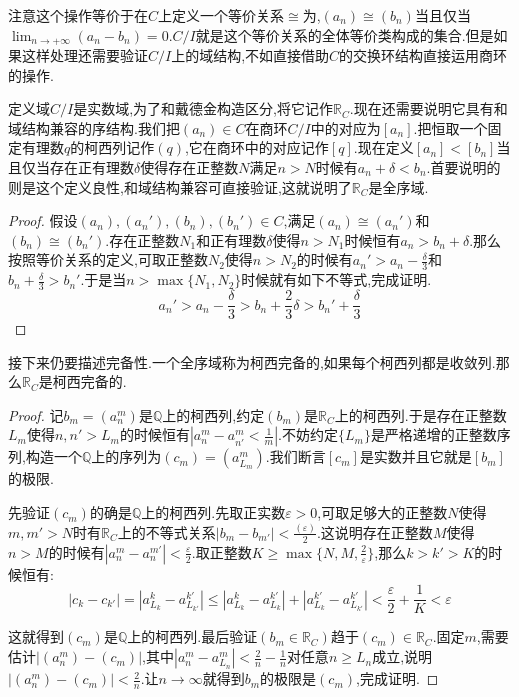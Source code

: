 注意这个操作等价于在$C$上定义一个等价关系$\cong$为,$(a_n)\cong(b_n)$当且仅当$\lim_{n\to+\infty}(a_n-b_n)=0$.$C/I$就是这个等价关系的全体等价类构成的集合.但是如果这样处理还需要验证$C/I$上的域结构,不如直接借助$C$的交换环结构直接运用商环的操作.

定义域$C/I$是实数域,为了和戴德金构造区分,将它记作$\mathbb{R}_C$.现在还需要说明它具有和域结构兼容的序结构.我们把$(a_n)\in C$在商环$C/I$中的对应为$[a_n]$.把恒取一个固定有理数$q$的柯西列记作$(q)$,它在商环中的对应记作$[q]$.现在定义$[a_n]<[b_n]$当且仅当存在正有理数$\delta$使得存在正整数$N$满足$n>N$时候有$a_n+\delta<b_n$.首要说明的则是这个定义良性,和域结构兼容可直接验证,这就说明了$\mathbb{R}_C$是全序域.
\begin{proof}
	
	假设$(a_n),(a_n'),(b_n),(b_n')\in C$,满足$(a_n)\cong(a_n')$和$(b_n)\cong(b_n')$.存在正整数$N_1$和正有理数$\delta$使得$n>N_1$时候恒有$a_n>b_n+\delta$.那么按照等价关系的定义,可取正整数$N_2$使得$n>N_2$的时候有$a_n'>a_n-\frac{\delta}{3}$和$b_n+\frac{\delta}{3}>b_n'$.于是当$n>\max\{N_1,N_2\}$时候就有如下不等式,完成证明.
	$$a_n'>a_n-\frac{\delta}{3}>b_n+\frac{2}{3}\delta>b_n'+\frac{\delta}{3}$$
\end{proof}

接下来仍要描述完备性.一个全序域称为柯西完备的,如果每个柯西列都是收敛列.那么$\mathbb{R}_C$是柯西完备的.
\begin{proof}
	
	记$b_m=(a^m_n)$是$\mathbb{Q}$上的柯西列,约定$(b_m)$是$\mathbb{R}_C$上的柯西列.于是存在正整数$L_m$使得$n,n'>L_m$的时候恒有$|a^m_n-a^m_{n'}<\frac{1}{m}|$.不妨约定$\{L_m\}$是严格递增的正整数序列,构造一个$\mathbb{Q}$上的序列为$(c_m)=(a^m_{L_m})$.我们断言$[c_m]$是实数并且它就是$[b_m]$的极限.
	
	先验证$(c_m)$的确是$\mathbb{Q}$上的柯西列.先取正实数$\varepsilon>0$,可取足够大的正整数$N$使得$m,m'>N$时有$\mathbb{R}_C$上的不等式关系$|b_m-b_{m'}|<\frac{(\varepsilon)}{2}$.这说明存在正整数$M$使得$n>M$的时候有$|a^m_n-a^{m'}_n|<\frac{\varepsilon}{2}$.取正整数$K\ge\max\{N,M,\frac{2}{\varepsilon}\}$,那么$k>k'>K$的时候恒有:
	$$|c_k-c_{k'}|=|a_{L_k}^k-a_{L_{k'}}^{k'}|\le|a_{L_k}^k-a_{L_k}^{k'}|+|a_{L_k}^{k'}-a_{L_{k'}}^{k'}|<\frac{\varepsilon}{2}+\frac{1}{K}<\varepsilon$$
	
	这就得到$(c_m)$是$\mathbb{Q}$上的柯西列.最后验证$(b_m\in\mathbb{R}_C)$趋于$(c_m)\in\mathbb{R}_C$.固定$m$,需要估计$|(a^m_n)-(c_m)|$,其中$|a^m_n-a^m_{L_n}|<\frac{2}{n}-\frac{1}{n}$对任意$n\ge L_n$成立,说明$|(a^m_n)-(c_m)|<\frac{2}{n}$.让$n\to\infty$就得到$b_m$的极限是$(c_m)$,完成证明.
\end{proof}

